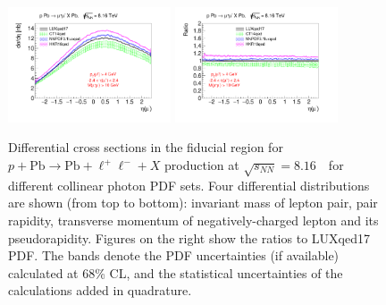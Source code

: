 \begin{figure}[]
\includegraphics[width=0.43\textwidth]{figures/etal_inc_cut.pdf}
\includegraphics[width=0.43\textwidth]{figures/Ratioetal_inc_cut.pdf}
\caption{Differential cross sections in the fiducial region for $p+\textrm{Pb}\rightarrow \textrm{Pb} + \ell^+\ell^- + X$ production at $\sqrt{s_{N N}} = 8.16$~\TeV\ for different collinear photon PDF sets.
Four differential distributions are shown (from top to bottom): invariant mass of lepton pair, pair rapidity, transverse momentum of negatively-charged lepton and its pseudorapidity. Figures on the right show the ratios to LUXqed17 PDF. The bands denote the PDF uncertainties (if available) calculated at 68\% CL, and the statistical uncertainties of the calculations added in quadrature.}
\label{fig:inc_cut}
\end{figure}






